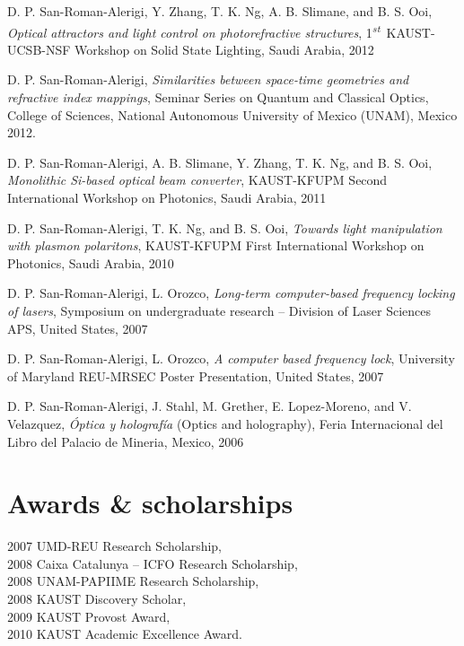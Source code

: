 \documentclass[margin,10pt]{res}
\newcommand{\st}{\textsuperscript{\emph{st}}}
\newcommand{\UNAM}{National Autonomous University of Mexico (UNAM)}
\begin{document}
D. P. San-Roman-Alerigi, Y. Zhang, T. K. Ng, A. B. Slimane, and B. S. Ooi, \emph{Optical attractors and light control on photorefractive structures}, 1\st~KAUST-UCSB-NSF Workshop on Solid State Lighting, Saudi Arabia, 2012

D. P. San-Roman-Alerigi, \emph{Similarities between space-time geometries and refractive index mappings}, Seminar Series on Quantum and Classical Optics, College of Sciences, \UNAM, Mexico 2012.

D. P. San-Roman-Alerigi, A. B. Slimane, Y. Zhang, T. K. Ng, and B. S. Ooi, \emph{Monolithic Si-based optical beam converter}, KAUST-KFUPM Second International Workshop on Photonics, Saudi Arabia, 2011

D. P. San-Roman-Alerigi, T. K. Ng, and B. S. Ooi, \emph{Towards light manipulation with plasmon polaritons}, KAUST-KFUPM First International Workshop on Photonics, Saudi Arabia, 2010

D. P. San-Roman-Alerigi, L. Orozco, \emph{Long-term computer-based frequency locking of lasers}, Symposium on undergraduate research -- Division of Laser Sciences APS, United States, 2007 

D. P. San-Roman-Alerigi, L. Orozco, \emph{A computer based frequency lock}, University of Maryland REU-MRSEC Poster Presentation, United States, 2007

D. P. San-Roman-Alerigi, J. Stahl, M. Grether, E. Lopez-Moreno, and V. Velazquez, \emph{\'Optica y holograf\'ia} (Optics and holography), Feria Internacional del Libro del Palacio de Mineria, Mexico, 2006


\section{Awards \& scholarships}

2007 UMD-REU Research Scholarship,\\ 
2008 Caixa Catalunya – ICFO Research Scholarship,\\ 
2008 UNAM-PAPIIME Research Scholarship,\\
2008 KAUST Discovery Scholar,\\
2009 KAUST Provost Award,\\
2010 KAUST Academic Excellence Award.\\

\end{document}
